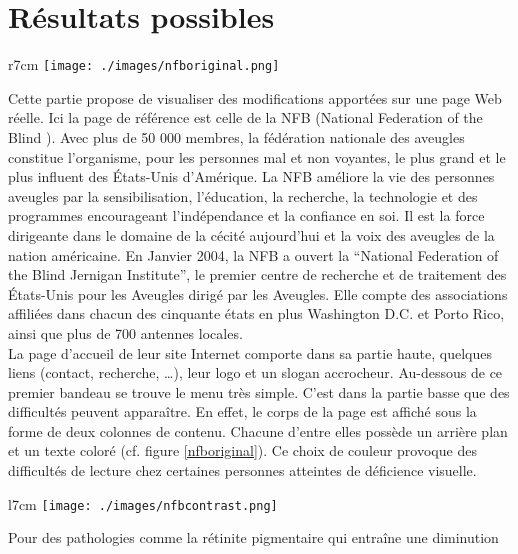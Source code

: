\documentclass[french,a4paper]{report}
\begin{document}
{\section{Résultats possibles}
\begin{wrapfigure}{r}{7cm}\centering
\texttt{[image: ./images/nfboriginal.png]}
\vspace{-0.6cm}
\caption{Page originale de la NFB}
\label{nfboriginal}
\end{wrapfigure}
Cette partie propose de visualiser des modifications apportées sur une page Web
réelle. Ici la page de référence est celle de la NFB (National Federation of the
Blind \cite{nfb}). Avec plus de 50 000 membres, la fédération nationale des
aveugles constitue l'organisme, pour les personnes mal et non voyantes, le plus
grand et le plus influent des États-Unis d'Amérique. La NFB améliore la vie des
personnes aveugles par la sensibilisation, l'éducation, la recherche, la
technologie et des programmes encourageant l'indépendance et la confiance en
soi. Il est la force dirigeante dans le domaine de la cécité aujourd'hui et la
voix des aveugles de la nation américaine. En Janvier 2004, la NFB a ouvert la
\enquote{National Federation of the Blind Jernigan Institute}, le premier
centre de recherche et de traitement des États-Unis pour les Aveugles dirigé par
les Aveugles. Elle compte des associations affiliées dans chacun des cinquante
états en plus Washington D.C. et Porto Rico, ainsi que plus de 700 antennes locales.\\
La page d'accueil de leur site Internet comporte dans sa partie haute, quelques
liens (contact, recherche, \dots), leur logo et un slogan accrocheur. Au-dessous
de ce premier bandeau se trouve le menu très simple. C'est dans la partie basse
que des difficultés peuvent apparaître. En effet, le corps de la page est
affiché sous la forme de deux colonnes de contenu. Chacune d'entre elles possède
un arrière plan et un texte coloré (cf. figure \ref{nfboriginal}). Ce choix de
couleur provoque des difficultés de lecture chez certaines personnes atteintes de
déficience visuelle.\\
\begin{wrapfigure}{l}{7cm}\centering
\texttt{[image: ./images/nfbcontrast.png]}
\vspace{-0.6cm}
\caption{Page adaptée pour le contraste}
\label{nfbcontrast}
\vspace{-0.8cm}
\end{wrapfigure}
Pour des pathologies comme la rétinite pigmentaire qui entraîne une diminution
}
\end{document}
